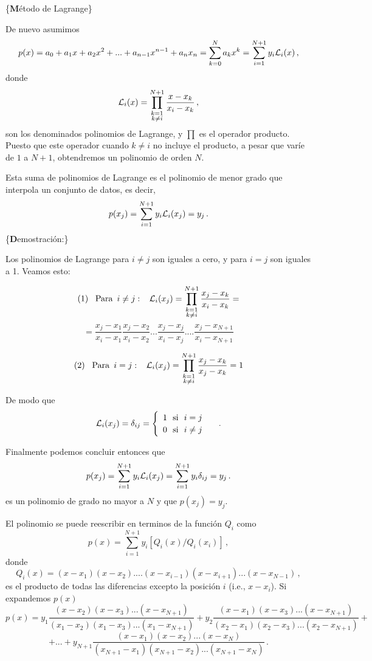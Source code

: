 \documentclass[
]{agujournal2019}
\begin{document}
\vspace{0.5cm}

\{\noindent \textbf Método de Lagrange\}

De nuevo asumimos
\[p(x)=a_0 + a_1 x + a_2 x^2 + ... + a_{n-1}x^{n-1} + a_n x_n=\sum\limits^{N}_{k=0} a_k x^k
=\sum^{N+1}_{i=1} y_i {\cal L}_i(x)\,,\] donde
\[{\cal L}_i(x)=\prod^{N+1}_{\substack{k=1\\ k\ne i}} \frac{x-x_k}{x_i-x_k}\,,\]
son los denominados polinomios de Lagrange, y \(\prod\) es el operador
producto. Puesto que este operador cuando \(k\ne i\) no incluye el
producto, a pesar que varíe de \(1\) a \(N+1\), obtendremos un polinomio
de orden \(N\).

Esta suma de polinomios de Lagrange es el polinomio de menor grado que
interpola un conjunto de datos, es decir,
\[p(x_j)=\sum^{N+1}_{i=1} y_i {\cal L}_i(x_j)=y_j\,.\]
\{\textbf Demostración:\}

Los polinomios de Lagrange para \(i\ne j\) son iguales a cero, y para
\(i=j\) son iguales a 1. Veamos esto:

\[{\rm (1)}\,\,\,\,\,{\rm Para}\,\,\,{i \ne j}:\,\,\,\,\,{\cal L}_i(x_j)=\prod^{N+1}_{\substack{k=1\\ k\ne i}} \frac{x_j-x_k}{x_i-x_k}=\]
\[=\frac{x_j-x_1}{x_i-x_1} \frac{x_j-x_2}{x_i-x_2} ...\frac{x_j-x_j}{x_i-x_j}....\frac{x_j-x_{N+1}}{x_i-x_{N+1}}\]

\[{\rm (2)}\,\,\,\,\,{\rm Para}\,\,\,{i = j}:\,\,\,\,\,{\cal L}_i(x_j)=\prod^{N+1}_{\substack{k=1\\ k\ne i}} \frac{x_j-x_k}{x_j-x_k}=1\]

De modo que \[{\cal L}_i(x_j)=\delta_{ij}=\begin{cases}
\begin{array}{c}
   1 \,\,\,\,\text{si}\,\,\,\,i= j\\
   0 \,\,\,\,\text{si}\,\,\,\,i\ne j\\
\end{array}
\end{cases}\,.\]

Finalmente podemos concluir entonces que
\[p(x_j)=\sum^{N+1}_{i=1} y_i {\cal L}_i(x_j)=\sum^{N+1}_{i=1} y_i \delta_{ij}=y_j\,.\]
es un polinomio de grado no mayor a \(N\) y que \(p(x_j)=y_j\).

El polinomio se puede reescribir en terminos de la función \(Q_i\) como
\[p(x)=\sum^{N+1}_{i=1} y_i[Q_i(x)/Q_i(x_i)]\,,\] donde
\[Q_i(x)=(x-x_1)(x-x_2)....(x-x_{i-1})(x-x_{i+1})...(x-x_{N-1})\,,\] es
el producto de todas las diferencias excepto la posición \(i\) (i.e.,
\(x-x_{i}\)). Si expandemos \(p(x)\)
\[p(x)=y_1\frac{(x-x_2)(x-x_3)...(x-x_{N+1})}{(x_1-x_2)(x_1-x_3)...(x_1-x_{N+1})} +
       y_2\frac{(x-x_1)(x-x_3)...(x-x_{N+1})}{(x_2-x_1)(x_2-x_3)...(x_2-x_{N+1})} +\]
\[+...+y_{N+1}\frac{(x-x_1)(x-x_2)...(x-x_{N})}{(x_{N+1}-x_1)(x_{N+1}-x_2)...(x_{N+1}-x_{N})}\,.\]
\end{document}
